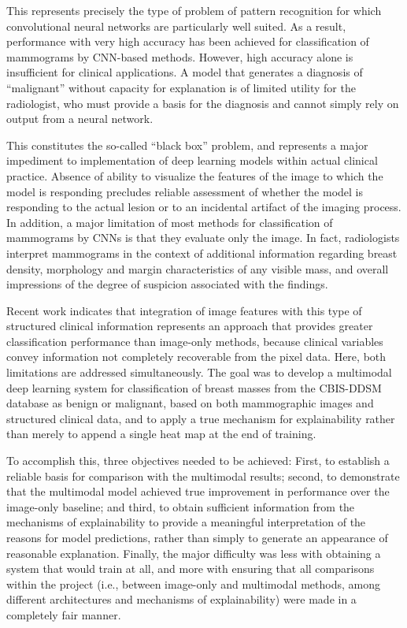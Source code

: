 This represents precisely the type of problem of pattern recognition for which convolutional neural networks are particularly well suited. As a result, performance with very high accuracy has been achieved for classification of mammograms by CNN-based methods. However, high accuracy alone is insufficient for clinical applications. A model that generates a diagnosis of ``malignant'' without capacity for explanation is of limited utility for the radiologist, who must provide a basis for the diagnosis and cannot simply rely on output from a neural network.

This constitutes the so-called ``black box'' problem, and represents a major impediment to implementation of deep learning models within actual clinical practice. Absence of ability to visualize the features of the image to which the model is responding precludes reliable assessment of whether the model is responding to the actual lesion or to an incidental artifact of the imaging process. In addition, a major limitation of most methods for classification of mammograms by CNNs is that they evaluate only the image. In fact, radiologists interpret mammograms in the context of additional information regarding breast density, morphology and margin characteristics of any visible mass, and overall impressions of the degree of suspicion associated with the findings.

Recent work indicates that integration of image features with this type of structured clinical information represents an approach that provides greater classification performance than image-only methods, because clinical variables convey information not completely recoverable from the pixel data. Here, both limitations are addressed simultaneously. The goal was to develop a multimodal deep learning system for classification of breast masses from the CBIS-DDSM database as benign or malignant, based on both mammographic images and structured clinical data, and to apply a true mechanism for explainability rather than merely to append a single heat map at the end of training.

To accomplish this, three objectives needed to be achieved: First, to establish a reliable basis for comparison with the multimodal results; second, to demonstrate that the multimodal model achieved true improvement in performance over the image-only baseline; and third, to obtain sufficient information from the mechanisms of explainability to provide a meaningful interpretation of the reasons for model predictions, rather than simply to generate an appearance of reasonable explanation. Finally, the major difficulty was less with obtaining a system that would train at all, and more with ensuring that all comparisons within the project (i.e., between image-only and multimodal methods, among different architectures and mechanisms of explainability) were made in a completely fair manner.

